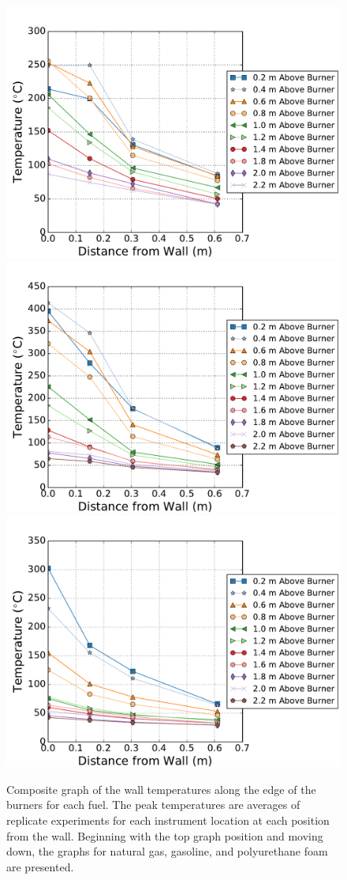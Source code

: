 \documentclass[twoside]{uocthesis}
\begin{document}
{\begin{figure}[p]
	\centering
	\includegraphics[width=.6\columnwidth]{../Figures/NCTW_NG_TC_Surface_Offset_Avg}\\
	\includegraphics[width=.6\columnwidth]{../Figures/NCTW_GAS_TC_Surface_Offset_Avg}\\
	\includegraphics[width=.6\columnwidth]{../Figures/NCTW_PUF_TC_Surface_Offset_Avg}\\
	\caption[Composite graph of the wall temperatures along the edge of the burners]{Composite graph of the wall temperatures along the edge of the burners for each fuel. The peak temperatures are averages of replicate experiments for each instrument location at each position from the wall. Beginning with the top graph position and moving down, the graphs for natural gas, gasoline, and polyurethane foam are presented.}
	\label{NCTW_Surf_Edge_comp}
\end{figure}


}
\end{document}
